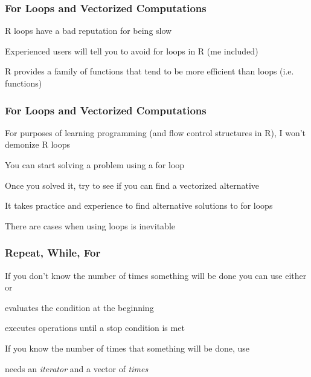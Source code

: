 \documentclass[12pt]{beamer}\usepackage[]{graphicx}\usepackage[]{color}
\begin{document}
\begin{frame}
\frametitle{For Loops and Vectorized Computations}

\bi
  \item R  loops have a bad reputation for being slow
  \item Experienced users will tell you to avoid for loops in R (me included)
  \item R provides a family of functions that tend to be more efficient than loops (i.e.  functions)
\ei

\end{frame}


\begin{frame}
\frametitle{For Loops and Vectorized Computations}

\bi
  \item For purposes of learning programming (and flow control structures in R), I won't demonize R loops
  \item You can start solving a problem using a for loop
  \item Once you solved it, try to see if you can find a vectorized alternative
  \item It takes practice and experience to find alternative solutions to for loops
  \item There are cases when using  loops is inevitable
\ei

\end{frame}


\begin{frame}
\frametitle{Repeat, While, For}

\bi
  \item If you don't know the number of times something will be done you can use either  or 
  \item {} evaluates the condition at the beginning
  \item {} executes operations until a stop condition is met
  \item If you know the number of times that something will be done, use 
  \item {} needs an \textit{iterator} and a vector of \textit{times}
\ei

\end{frame}
\end{document}
